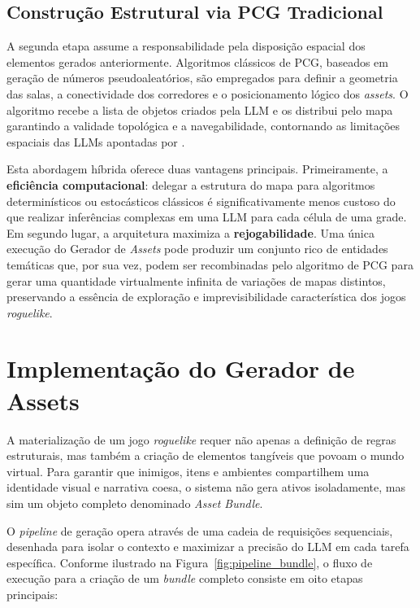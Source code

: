\subsection{Construção Estrutural via PCG Tradicional}
A segunda etapa assume a responsabilidade pela disposição espacial dos elementos
gerados anteriormente. Algoritmos clássicos de PCG, baseados em geração de
números pseudoaleatórios, são empregados para definir a geometria das salas, a
conectividade dos corredores e o posicionamento lógico dos \textit{assets}. O
algoritmo recebe a lista de objetos criados pela \gls{LLM} e os distribui pelo mapa
garantindo a validade topológica e a navegabilidade, contornando as limitações
espaciais das \gls{LLM}s apontadas por \citeauthor{yan2023inherent}.

Esta abordagem híbrida oferece duas vantagens principais. Primeiramente, a
\textbf{eficiência computacional}: delegar a estrutura do mapa para algoritmos
determinísticos ou estocásticos clássicos é significativamente menos custoso do
que realizar inferências complexas em uma \gls{LLM} para cada célula de uma
grade. Em segundo lugar, a arquitetura maximiza a \textbf{rejogabilidade}. Uma
única execução do Gerador de \textit{Assets} pode produzir um conjunto rico de
entidades temáticas que, por sua vez, podem ser recombinadas pelo algoritmo de
PCG para gerar uma quantidade virtualmente infinita de variações de mapas
distintos, preservando a essência de exploração e imprevisibilidade
característica dos jogos \textit{roguelike}.


\section{Implementação do Gerador de Assets}
\label{sec:implementacao_assets}

A materialização de um jogo \textit{roguelike} requer não apenas a definição de
regras estruturais, mas também a criação de elementos tangíveis que povoam o
mundo virtual. Para garantir que inimigos, itens e ambientes compartilhem uma
identidade visual e narrativa coesa, o sistema não gera ativos isoladamente, mas
sim um objeto completo denominado \textit{Asset Bundle}.

O \textit{pipeline} de geração opera através de uma cadeia de requisições
sequenciais, desenhada para isolar o contexto e maximizar a precisão do \gls{LLM} em
cada tarefa específica. Conforme ilustrado na Figura~\ref{fig:pipeline_bundle}, o
fluxo de execução para a criação de um \textit{bundle} completo consiste em oito
etapas principais:

